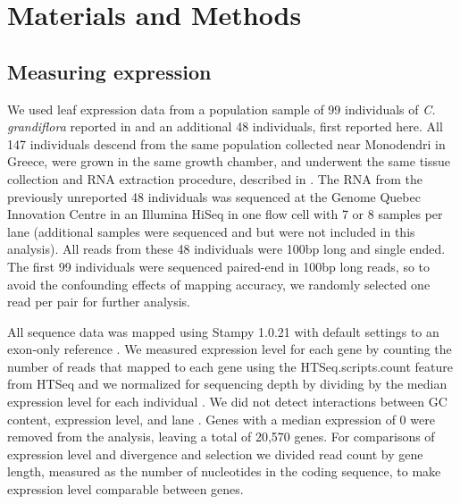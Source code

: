 \section{Materials and Methods}

\subsection{Measuring expression}
We used leaf expression data from a population sample of 99 individuals of \textit{C. grandiflora} reported in \citet{Josephs2015-nx} and an additional 48 individuals, first reported here. All 147 individuals descend from the same population collected near Monodendri in Greece, were grown in the same growth chamber, and underwent the same tissue collection and RNA extraction procedure, described in \citet{Josephs2015-nx}. The RNA from the previously unreported 48 individuals was sequenced at the Genome Quebec Innovation Centre in an Illumina HiSeq in one flow cell with 7 or 8 samples per lane (additional samples were sequenced and but were not included in this analysis). All reads from these 48 individuals were 100bp long and single ended. The first 99 individuals were sequenced paired-end in 100bp long reads, so to avoid the confounding effects of mapping accuracy, we randomly selected one read per pair for further analysis.

All sequence data was mapped using Stampy 1.0.21 \citep{Lunter2011-uc} with default settings to an exon-only reference \citep{Josephs2015-nx}. We measured expression level for each gene by counting the number of reads that mapped to each gene using the HTSeq.scripts.count feature from HTSeq and we normalized for sequencing depth by dividing by the median expression level for each individual \citep{Anders2015-qa}. We did not detect interactions between GC content, expression level, and lane \citep{Josephs2015-nx}. Genes with a median expression of 0 were removed from the analysis, leaving a total of 20,570 genes. For comparisons of expression level and divergence and selection we divided read count by gene length, measured as the number of nucleotides in the coding sequence, to make expression level comparable between genes.

